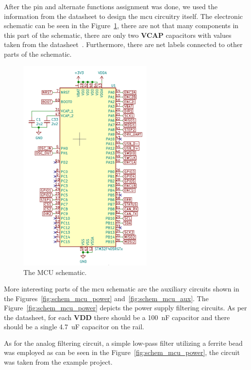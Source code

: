 After the pin and alternate functions assignment was done, we used the information from the datasheet to design the \acs{mcu} circuitry itself.
The electronic schematic can be seen in the Figure~\ref{fig:schem_mcu}, there are not that many components in this part of the schematic, there are only two \textbf{VCAP} capacitors with values taken from the datasheet~\cite{stmicro_stm32f405xx_2020}.
Furthermore, there are net labels connected to other parts of the schematic.

\begin{figure}[H]
    \centering
    \includegraphics[width=0.6\textwidth]{obrazky/schem_mcu}
    \caption{The MCU schematic.}
    \label{fig:schem_mcu}
\end{figure}

More interesting parts of the \acs{mcu} schematic are the auxiliary circuits shown in the Figures~\ref{fig:schem_mcu_power} and~\ref{fig:schem_mcu_aux}.
The Figure~\ref{fig:schem_mcu_power} depicts the power supply filtering circuits.
As per the datasheet\cite{stmicro_stm32f405xx_2020}, for each \textbf{VDD} there should be a 100~nF capacitor and there should be a single 4.7~uF capacitor on the rail.

As for the analog filtering circuit, a simple low-pass filter utilizing a ferrite bead was employed as can be seen in the Figure~\ref{fig:schem_mcu_power}, the circuit was taken from the example project\cite{salmony_kicad_2020}.

